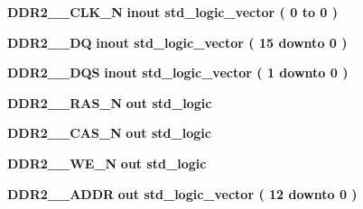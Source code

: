 \begin{DoxyCompactItemize}
\item 
{\bf D\+D\+R2\+\_\+\_\+\+C\+L\+K\+\_\+N}  {\bfseries {\bfseries \textcolor{keywordflow}{inout}\textcolor{vhdlchar}{ }}} {\bfseries \textcolor{comment}{std\+\_\+logic\+\_\+vector}\textcolor{vhdlchar}{ }\textcolor{vhdlchar}{(}\textcolor{vhdlchar}{ }\textcolor{vhdlchar}{ } \textcolor{vhdldigit}{0} \textcolor{vhdlchar}{ }\textcolor{keywordflow}{to}\textcolor{vhdlchar}{ }\textcolor{vhdlchar}{ } \textcolor{vhdldigit}{0} \textcolor{vhdlchar}{ }\textcolor{vhdlchar}{)}\textcolor{vhdlchar}{ }} 
\item 
{\bf D\+D\+R2\+\_\+\_\+\+DQ}  {\bfseries {\bfseries \textcolor{keywordflow}{inout}\textcolor{vhdlchar}{ }}} {\bfseries \textcolor{comment}{std\+\_\+logic\+\_\+vector}\textcolor{vhdlchar}{ }\textcolor{vhdlchar}{(}\textcolor{vhdlchar}{ }\textcolor{vhdlchar}{ } \textcolor{vhdldigit}{15} \textcolor{vhdlchar}{ }\textcolor{keywordflow}{downto}\textcolor{vhdlchar}{ }\textcolor{vhdlchar}{ } \textcolor{vhdldigit}{0} \textcolor{vhdlchar}{ }\textcolor{vhdlchar}{)}\textcolor{vhdlchar}{ }} 
\item 
{\bf D\+D\+R2\+\_\+\_\+\+D\+QS}  {\bfseries {\bfseries \textcolor{keywordflow}{inout}\textcolor{vhdlchar}{ }}} {\bfseries \textcolor{comment}{std\+\_\+logic\+\_\+vector}\textcolor{vhdlchar}{ }\textcolor{vhdlchar}{(}\textcolor{vhdlchar}{ }\textcolor{vhdlchar}{ } \textcolor{vhdldigit}{1} \textcolor{vhdlchar}{ }\textcolor{keywordflow}{downto}\textcolor{vhdlchar}{ }\textcolor{vhdlchar}{ } \textcolor{vhdldigit}{0} \textcolor{vhdlchar}{ }\textcolor{vhdlchar}{)}\textcolor{vhdlchar}{ }} 
\item 
{\bf D\+D\+R2\+\_\+\_\+\+R\+A\+S\+\_\+N}  {\bfseries {\bfseries \textcolor{keywordflow}{out}\textcolor{vhdlchar}{ }}} {\bfseries \textcolor{comment}{std\+\_\+logic}\textcolor{vhdlchar}{ }} 
\item 
{\bf D\+D\+R2\+\_\+\_\+\+C\+A\+S\+\_\+N}  {\bfseries {\bfseries \textcolor{keywordflow}{out}\textcolor{vhdlchar}{ }}} {\bfseries \textcolor{comment}{std\+\_\+logic}\textcolor{vhdlchar}{ }} 
\item 
{\bf D\+D\+R2\+\_\+\_\+\+W\+E\+\_\+N}  {\bfseries {\bfseries \textcolor{keywordflow}{out}\textcolor{vhdlchar}{ }}} {\bfseries \textcolor{comment}{std\+\_\+logic}\textcolor{vhdlchar}{ }} 
\item 
{\bf D\+D\+R2\+\_\+\_\+\+A\+D\+DR}  {\bfseries {\bfseries \textcolor{keywordflow}{out}\textcolor{vhdlchar}{ }}} {\bfseries \textcolor{comment}{std\+\_\+logic\+\_\+vector}\textcolor{vhdlchar}{ }\textcolor{vhdlchar}{(}\textcolor{vhdlchar}{ }\textcolor{vhdlchar}{ } \textcolor{vhdldigit}{12} \textcolor{vhdlchar}{ }\textcolor{keywordflow}{downto}\textcolor{vhdlchar}{ }\textcolor{vhdlchar}{ } \textcolor{vhdldigit}{0} \textcolor{vhdlchar}{ }\textcolor{vhdlchar}{)}\textcolor{vhdlchar}{ }} 

\end{DoxyCompactItemize}
